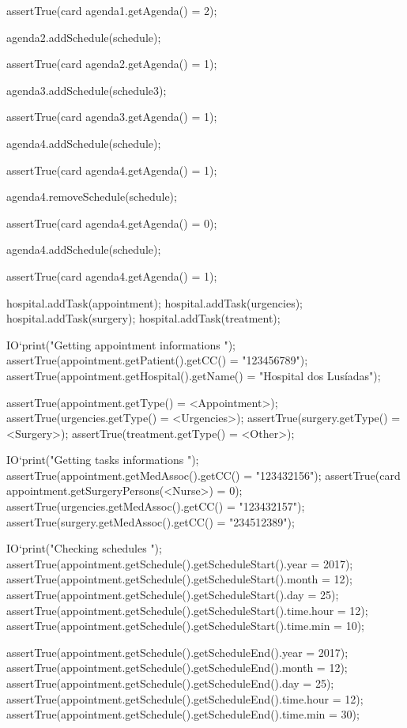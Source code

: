 \begin{vdmpp}[breaklines=true]
   assertTrue(card agenda1.getAgenda() = 2);
   
   agenda2.addSchedule(schedule);
   
   assertTrue(card agenda2.getAgenda() = 1);
  
   agenda3.addSchedule(schedule3);
   
   assertTrue(card agenda3.getAgenda() = 1);
   
   agenda4.addSchedule(schedule);
   
   assertTrue(card agenda4.getAgenda() = 1);
   
   agenda4.removeSchedule(schedule);
   
   assertTrue(card agenda4.getAgenda() = 0);
   
   agenda4.addSchedule(schedule);
   
   assertTrue(card agenda4.getAgenda() = 1);
   
   hospital.addTask(appointment);
   hospital.addTask(urgencies);
   hospital.addTask(surgery);
   hospital.addTask(treatment);
   
   IO`print("\n Getting appointment informations \n");
   assertTrue(appointment.getPatient().getCC() = "123456789");
   assertTrue(appointment.getHospital().getName() = "Hospital dos Lusíadas");
   
   assertTrue(appointment.getType() = <Appointment>);
   assertTrue(urgencies.getType() = <Urgencies>);
   assertTrue(surgery.getType() = <Surgery>);
   assertTrue(treatment.getType() = <Other>);
  
   IO`print("\n Getting tasks informations \n");
   assertTrue(appointment.getMedAssoc().getCC() = "123432156");
   assertTrue(card appointment.getSurgeryPersons(<Nurse>) = 0);
   assertTrue(urgencies.getMedAssoc().getCC() = "123432157");
   assertTrue(surgery.getMedAssoc().getCC() = "234512389");
   
   IO`print("\n Checking schedules \n");
   assertTrue(appointment.getSchedule().getScheduleStart().year = 2017);
   assertTrue(appointment.getSchedule().getScheduleStart().month = 12);
   assertTrue(appointment.getSchedule().getScheduleStart().day = 25);
   assertTrue(appointment.getSchedule().getScheduleStart().time.hour = 12);
   assertTrue(appointment.getSchedule().getScheduleStart().time.min = 10);
   
   assertTrue(appointment.getSchedule().getScheduleEnd().year = 2017);
   assertTrue(appointment.getSchedule().getScheduleEnd().month = 12);
   assertTrue(appointment.getSchedule().getScheduleEnd().day = 25);
   assertTrue(appointment.getSchedule().getScheduleEnd().time.hour = 12);
   assertTrue(appointment.getSchedule().getScheduleEnd().time.min = 30);
   

\end{vdmpp}

